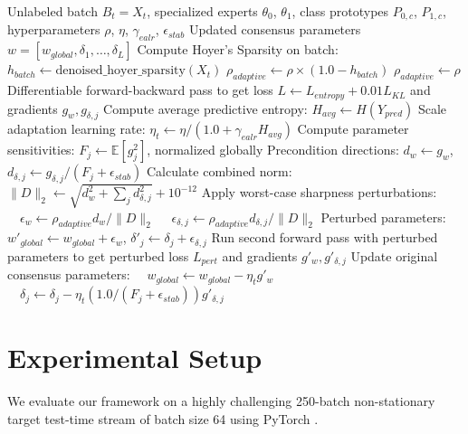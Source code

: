 \documentclass{article}
\theoremstyle{plain}
\theoremstyle{definition}
\theoremstyle{remark}
\begin{document}
\begin{algorithm}[tb]
\caption{SW-SAM-TTMM Step}
\label{alg:sw-sam}
\begin{algorithmic}[1]
 Unlabeled batch $B_t = X_t$, specialized experts $\theta_0$, $\theta_1$, class prototypes $P_{0, c}$, $P_{1, c}$, hyperparameters $\rho$, $\eta$, $\gamma_{ealr}$, $\epsilon_{stab}$
 Updated consensus parameters $w = [w_{global}, \delta_1, \ldots, \delta_L]$
\STATE Compute Hoyer's Sparsity on batch: $h_{batch} \leftarrow \text{denoised\_hoyer\_sparsity}(X_t)$
  \STATE $\rho_{adaptive} \leftarrow \rho \times (1.0 - h_{batch})$
\ELSE
  \STATE $\rho_{adaptive} \leftarrow \rho$
\ENDIF
\STATE Differentiable forward-backward pass to get loss $L \leftarrow L_{entropy} + 0.01 L_{KL}$ and gradients $g_w, g_{\delta, j}$
\STATE Compute average predictive entropy: $H_{avg} \leftarrow H(Y_{pred})$
\STATE Scale adaptation learning rate: $\eta_t \leftarrow \eta / (1.0 + \gamma_{ealr} H_{avg})$
\STATE Compute parameter sensitivities: $F_j \leftarrow \mathbb{E}[g_j^2]$, normalized globally
\STATE Precondition directions: $d_w \leftarrow g_w$, $d_{\delta, j} \leftarrow g_{\delta, j} / (F_j + \epsilon_{stab})$
\STATE Calculate combined norm: $\|D\|_2 \leftarrow \sqrt{d_w^2 + \sum_j d_{\delta, j}^2} + 10^{-12}$
\STATE Apply worst-case sharpness perturbations:
\STATE $\quad \epsilon_w \leftarrow \rho_{adaptive} d_w / \|D\|_2$
\STATE $\quad \epsilon_{\delta, j} \leftarrow \rho_{adaptive} d_{\delta, j} / \|D\|_2$
\STATE Perturbed parameters: $w'_{global} \leftarrow w_{global} + \epsilon_w$, $\delta'_j \leftarrow \delta_j + \epsilon_{\delta, j}$
\STATE Run second forward pass with perturbed parameters to get perturbed loss $L_{pert}$ and gradients $g'_w, g'_{\delta, j}$
\STATE Update original consensus parameters:
\STATE $\quad w_{global} \leftarrow w_{global} - \eta_t g'_w$
\STATE $\quad \delta_j \leftarrow \delta_j - \eta_t (1.0 / (F_j + \epsilon_{stab})) g'_{\delta, j}$
\end{algorithmic}
\end{algorithm}

\section{Experimental Setup}
\label{submission-experiments}

We evaluate our framework on a highly challenging 250-batch non-stationary target test-time stream of batch size 64 using PyTorch \cite{paszke2019pytorch}.
\end{document}
